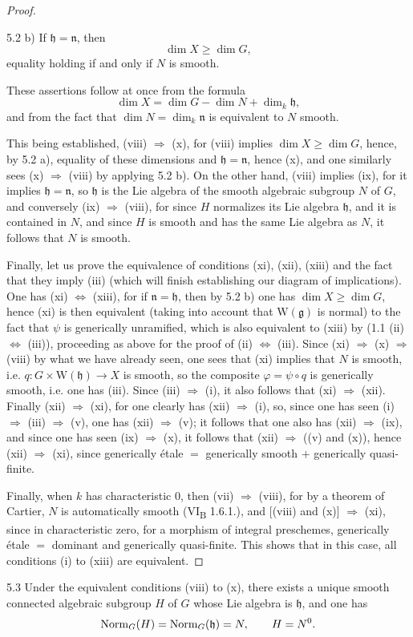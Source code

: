 \begin{proof}
\begin{lemma}{5.2}
\noindent b) If $\mathfrak h=\mathfrak n$, then
\[
 \dim X\geq\dim G,
\]
equality holding if and only if $N$ is smooth.
\end{lemma}
These assertions follow at once from the formula
\[
 \dim X=\dim G-\dim N+\dim_k\mathfrak h,
\]
and from the fact that $\dim N=\dim_k\mathfrak n$ is equivalent to
$N$ smooth.

This being established, (viii) $\Rightarrow$ (x), for (viii) implies
$\dim X\geq\dim G$, hence, by 5.2 a), equality of these dimensions
and $\mathfrak h=\mathfrak n$, hence (x), and one similarly sees
(x) $\Rightarrow$ (viii) by applying 5.2 b). On the other hand,
(viii) implies (ix), for it implies $\mathfrak h=\mathfrak n$,
so $\mathfrak h$ is the Lie algebra of the smooth algebraic subgroup
$N$ of $G$, and conversely (ix) $\Rightarrow$ (viii), for since $H$
normalizes its Lie algebra $\mathfrak h$, and it is contained in $N$,
and since $H$ is smooth and has the same Lie algebra as $N$, it
follows that $N$ is smooth.

Finally, let us prove the equivalence of conditions (xi), (xii),
(xiii) and the fact that they imply (iii) (which will finish
establishing our diagram of implications). One has (xi)
$\Leftrightarrow$ (xiii), for if $\mathfrak n=\mathfrak h$, then
by 5.2 b) one has $\dim X\geq\dim G$, hence (xi) is then equivalent
(taking into account that $\mathrm W(\mathfrak g)$ is normal) to
the fact that $\psi$ is generically unramified, which is also
equivalent to (xiii) by (1.1 (ii) $\Leftrightarrow$ (iii)), proceeding
as above for the proof of (ii) $\Leftrightarrow$ (iii). Since
(xi) $\Rightarrow$ (x) $\Rightarrow$ (viii) by what we have already
seen, one sees that (xi) implies that $N$ is smooth, i.e.
$q:G\times\mathrm W(\mathfrak h)\to X$ is smooth, so the composite
$\varphi=\psi\circ q$ is generically smooth, i.e. one has (iii).
Since (iii) $\Rightarrow$ (i), it also follows that (xi)
$\Rightarrow$ (xii). Finally (xii)
$\Rightarrow$ (xi), for one clearly has (xii) $\Rightarrow$ (i),
so, since one has seen (i) $\Rightarrow$ (iii) $\Rightarrow$ (v),
one has (xii) $\Rightarrow$ (v); it follows that one also has
(xii) $\Rightarrow$ (ix), and since one has seen (ix)
$\Rightarrow$ (x), it follows that (xii) $\Rightarrow$ ((v) and (x)),
hence (xii) $\Rightarrow$ (xi), since generically \'etale $=$
generically smooth $+$ generically quasi-finite.

Finally, when $k$ has characteristic $0$, then (vii) $\Rightarrow$
(viii), for by a theorem of Cartier, $N$ is automatically smooth
(VI\textsubscript{B} 1.6.1.), and [(viii) and (x)] $\Rightarrow$ (xi),
since in characteristic zero, for a morphism of integral preschemes,
generically \'etale $=$ dominant and generically quasi-finite.
This shows that in this case, all conditions (i) to (xiii) are
equivalent.
\end{proof}

\begin{corollary}{5.3}\label{XIII.5.3}
Under the equivalent conditions (viii) to (x), there exists a unique
smooth connected algebraic subgroup $H$ of $G$ whose Lie algebra is
$\mathfrak h$, and one has
\[
 \operatorname{Norm}_G(H)=\operatorname{Norm}_G(\mathfrak h)=N,\qquad H=N^0.
\]
\end{corollary}
